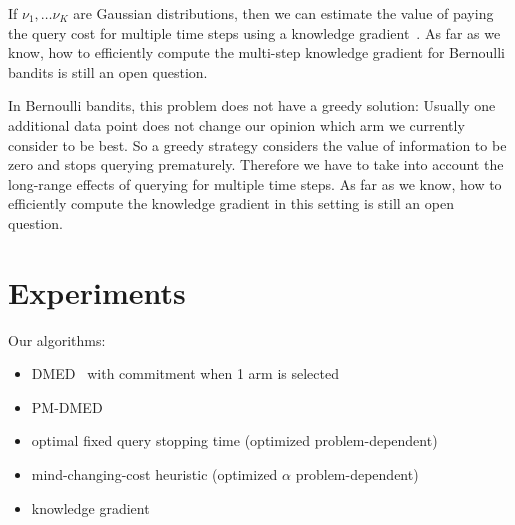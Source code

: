 \documentclass[a4paper]{article}
\begin{document}
If $\nu_1, \ldots \nu_K$ are Gaussian distributions,
then we can estimate the value of paying the query cost for multiple time steps using
a knowledge gradient~\citep[Ch.~5]{PowellRyzhov12}.
As far as we know, how to efficiently compute the multi-step knowledge gradient for Bernoulli bandits is still an open question.



In Bernoulli bandits, this problem does not have a greedy solution:
Usually one additional data point does not change our opinion
which arm we currently consider to be best.
So a greedy strategy considers the value of information to be zero and stops querying prematurely.
Therefore we have to take into account the long-range effects of querying for multiple time steps.
As far as we know, how to efficiently compute the knowledge gradient in this setting is still an open question.



\section{Experiments}

Our algorithms:
\begin{itemize}
\item DMED~\citep{Honda10} with commitment when 1 arm is selected
\item PM-DMED~\citep{Komiyama15}
\item optimal fixed query stopping time (optimized problem-dependent)
\item mind-changing-cost heuristic (optimized $\alpha$ problem-dependent)
\item knowledge gradient
\end{itemize}
\end{document}
